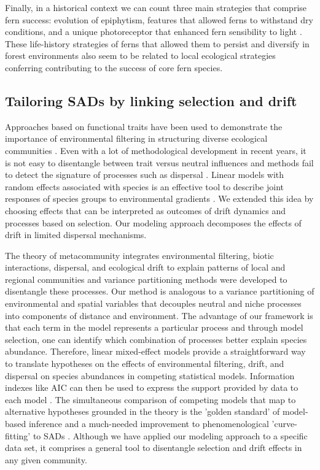 \documentclass[12pt]{article}
\begin{document}
Finally, in a historical context we can count three main strategies that comprise fern success: evolution of epiphytism, features that allowed ferns to withstand dry conditions, and a unique photoreceptor that enhanced fern sensibility to light \citep{Schneider2004, Schuettpelz2009}. These life-history strategies of ferns that allowed them to persist and diversify in forest environments also seem to be related to local ecological
strategies conferring contributing to the success of core fern species. 


\subsection*{Tailoring SADs by linking selection and drift}

Approaches based on functional traits have been used to demonstrate the importance of environmental  filtering  in  structuring  diverse  ecological communities \citep{lavorel2002predicting, Baraloto2012}. Even with a lot of methodological development in recent years, it is not easy to disentangle between trait versus neutral influences and methods fail to detect the signature of processes such as dispersal \citep{kembel2009disentangling}. 
Linear models with random effects associated with species is an effective tool to describe joint responses of species groups to environmental gradients \citep{Jackson2012, Brown2014}. We extended this idea by choosing effects that can be interpreted as outcomes of drift dynamics and processes based on selection. Our modeling approach  decomposes the effects of drift in limited dispersal mechanisms.

The theory of metacommunity integrates environmental filtering, biotic interactions, dispersal, and ecological drift to explain patterns of local and regional communities \citep{leibold2017metacommunity, o2019metacommunity} and variance partitioning methods were developed to disentangle these processes. 
 Our method is analogous to a variance partitioning of environmental and spatial variables \citep{Gilbert2004a} that decouples neutral and niche processes into components of distance and environment. The advantage of our framework is that each term in the model represents a particular process and through model selection, one can identify which combination of processes better explain species abundance. Therefore, linear mixed-effect models provide a straightforward way to translate hypotheses on the effects of environmental filtering, drift, and dispersal on species abundances in competing statistical models. Information indexes like AIC can then be used to express the support provided by data to each model \citep{Burham2002, Johnson2004}. The simultaneous comparison of competing models that map to alternative hypotheses grounded in the theory is the 'golden standard' of model-based inference \citep{Hilborn1997} and a much-needed improvement to phenomenological 'curve-fitting' to SADs \citep{Mcgill2003}. Although we have applied our modeling approach to a specific data set, it comprises a general tool to disentangle selection and drift effects in any given community. 
\end{document}
